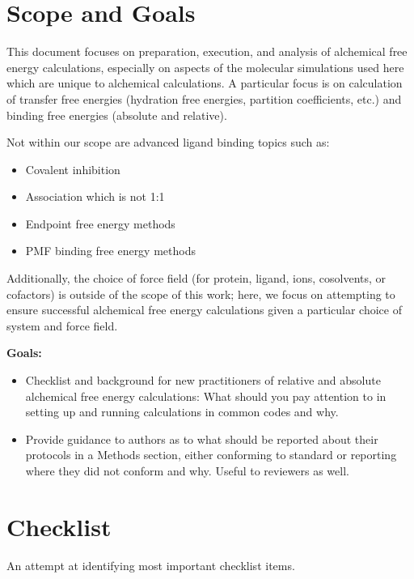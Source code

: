 \documentclass[9pt,bestpractices]{livecoms}
\begin{document}
\section{Scope and Goals}
\label{sec:scope}

This document focuses on preparation, execution, and analysis of alchemical free energy calculations, especially on aspects of the molecular simulations used here which are unique to alchemical calculations.
A particular focus is on calculation of transfer free energies (hydration free energies, partition coefficients, etc.) and binding free energies (absolute and relative).

Not within our scope are advanced ligand binding topics such as:

\begin{itemize}
\item Covalent inhibition
\item Association which is not 1:1
\item Endpoint free energy methods
\item PMF binding free energy methods
\end{itemize}

Additionally, the choice of force field (for protein, ligand, ions, cosolvents, or cofactors) is outside of the scope of this work; here, we focus on attempting to ensure successful alchemical free energy calculations given a particular choice of system and force field.

\textbf{Goals:}
\begin{itemize}
\item Checklist and background for new practitioners of relative and absolute alchemical free energy calculations: What should you pay attention to in setting up and running calculations in common codes and why.
\item Provide guidance to authors as to what should be reported about their protocols in a Methods section, either conforming to standard or reporting where they did not conform and why. Useful to reviewers as well.
\end{itemize}
\section{Checklist}
\label{sec:checklist}
An attempt at identifying most important checklist items.
\end{document}
